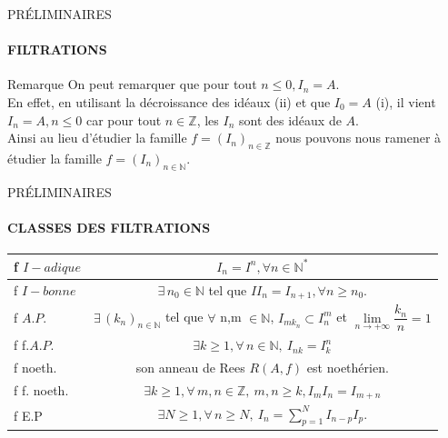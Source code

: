 \documentclass[11pt,a4paper]{beamer}
\begin{document}
		\begin{frame}{PRÉLIMINAIRES}
		\framesubtitle{FILTRATIONS}
		\begin{alertblock}{Remarque}
		On peut remarquer que pour tout $n\leq 0, I_n = A$.\\ En effet, en utilisant la décroissance des idéaux (ii) et que $I_0 = A$ (i), il vient $I_n = A, n \leq 0$ car pour tout $ n \in \mathbb{Z}$, les $I_n$ sont des idéaux de $A$.\\
		Ainsi au lieu d'étudier la famille $f = (I_n)_{n \in \mathbb{Z}}$ nous pouvons nous ramener à étudier la famille $f = (I_n)_{n \in \mathbb{N}}$.
		\end{alertblock}
	\end{frame}
		\begin{frame}{PRÉLIMINAIRES}
		\framesubtitle{CLASSES DES FILTRATIONS}
		\begin{block}{}
		\begin{center}
			\begin{tabular}{|l|c|}
				\hline
				f $I-adique$ &$I_n=I^n,\forall n \in \mathbb{N}^*$\\
				\hline
				f $I-bonne$ &$\exists \, n_0 \in \mathbb{N}$ tel que $II_n = I_{n+1}, \forall n \geqslant n_0.$\\
				\hline
				f $A.P.$ &$\exists \, (k_n)_{n\in \mathbb{N}} $ tel que $\forall$ n,m $\in \mathbb{N}$, $I_{mk_n} \subset I_n^{m}$ et $\underset{n\longrightarrow +\infty }{\lim }\dfrac{k_{n}}{n}=1$\\
				\hline
				f f.$A.P.$ &$\exists k\geqslant 1, \forall \, n \in \mathbb{N}, \ I_{nk} = I_k^n$\\
				\hline
				f noeth. & son anneau de Rees ${R}(A,f)$ est noethérien.\\
				\hline
				f f. noeth. & $\exists k\geqslant 1, \forall \, m, n \in \mathbb{Z}, \ m, n \geqslant k, I_m I_n = I_{m+n}$\\
				\hline
				f E.P & $\exists N\geqslant 1, \forall \, n \geqslant N, \ I_n =\sum\limits_{p=1}^{N} I_{n-p}I_p. $\\
				\hline
			\end{tabular}
		\end{center}
		\end{block}
	\end{frame}	
	
\end{document}

